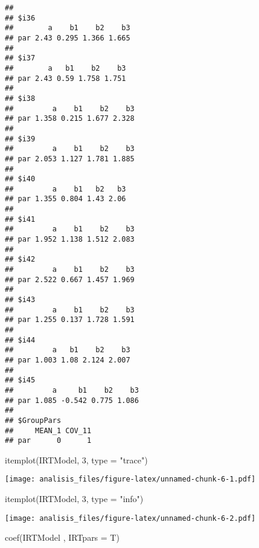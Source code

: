 \documentclass[
]{article}
\newenvironment{Shaded}{\begin{snugshade}}{\end{snugshade}}
\newcommand{\AttributeTok}[1]{\textcolor[rgb]{0.77,0.63,0.00}{#1}}
\newcommand{\DecValTok}[1]{\textcolor[rgb]{0.00,0.00,0.81}{#1}}
\newcommand{\FunctionTok}[1]{\textcolor[rgb]{0.00,0.00,0.00}{#1}}
\newcommand{\NormalTok}[1]{#1}
\newcommand{\StringTok}[1]{\textcolor[rgb]{0.31,0.60,0.02}{#1}}
\begin{document}
\begin{verbatim}
## 
## $i36
##        a    b1    b2    b3
## par 2.43 0.295 1.366 1.665
## 
## $i37
##        a   b1    b2    b3
## par 2.43 0.59 1.758 1.751
## 
## $i38
##         a    b1    b2    b3
## par 1.358 0.215 1.677 2.328
## 
## $i39
##         a    b1    b2    b3
## par 2.053 1.127 1.781 1.885
## 
## $i40
##         a    b1   b2   b3
## par 1.355 0.804 1.43 2.06
## 
## $i41
##         a    b1    b2    b3
## par 1.952 1.138 1.512 2.083
## 
## $i42
##         a    b1    b2    b3
## par 2.522 0.667 1.457 1.969
## 
## $i43
##         a    b1    b2    b3
## par 1.255 0.137 1.728 1.591
## 
## $i44
##         a   b1    b2    b3
## par 1.003 1.08 2.124 2.007
## 
## $i45
##         a     b1    b2    b3
## par 1.085 -0.542 0.775 1.086
## 
## $GroupPars
##     MEAN_1 COV_11
## par      0      1
\end{verbatim}

\begin{Shaded}
\begin{Highlighting}[]
\FunctionTok{itemplot}\NormalTok{(IRTModel, }\DecValTok{3}\NormalTok{, }\AttributeTok{type =} \StringTok{"trace"}\NormalTok{)}
\end{Highlighting}
\end{Shaded}

\texttt{[image: analisis\_files/figure-latex/unnamed-chunk-6-1.pdf]}

\begin{Shaded}
\begin{Highlighting}[]
\FunctionTok{itemplot}\NormalTok{(IRTModel, }\DecValTok{3}\NormalTok{, }\AttributeTok{type =} \StringTok{"info"}\NormalTok{)}
\end{Highlighting}
\end{Shaded}

\texttt{[image: analisis\_files/figure-latex/unnamed-chunk-6-2.pdf]}

\begin{Shaded}
\begin{Highlighting}[]
\FunctionTok{coef}\NormalTok{(IRTModel , }\AttributeTok{IRTpars =}\NormalTok{ T)}
\end{Highlighting}
\end{Shaded}
\end{document}
